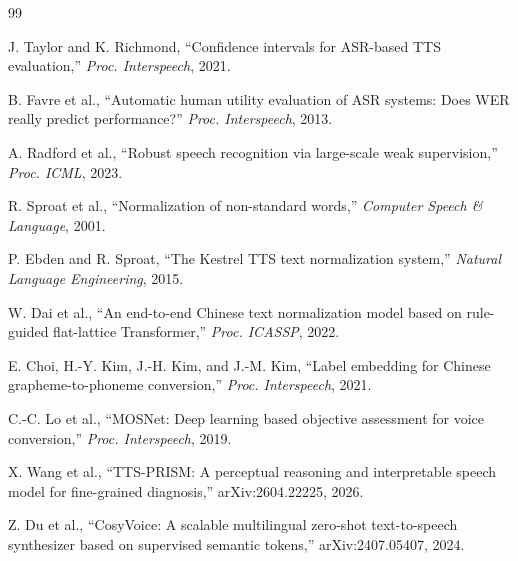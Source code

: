 \documentclass{article}
\begin{document}
\begin{thebibliography}{99}

J. Taylor and K. Richmond, ``Confidence intervals for ASR-based TTS evaluation,'' \emph{Proc. Interspeech}, 2021.

B. Favre et al., ``Automatic human utility evaluation of ASR systems: Does WER really predict performance?'' \emph{Proc. Interspeech}, 2013.

A. Radford et al., ``Robust speech recognition via large-scale weak supervision,'' \emph{Proc. ICML}, 2023.

R. Sproat et al., ``Normalization of non-standard words,'' \emph{Computer Speech \& Language}, 2001.

P. Ebden and R. Sproat, ``The Kestrel TTS text normalization system,'' \emph{Natural Language Engineering}, 2015.

W. Dai et al., ``An end-to-end Chinese text normalization model based on rule-guided flat-lattice Transformer,'' \emph{Proc. ICASSP}, 2022.

E. Choi, H.-Y. Kim, J.-H. Kim, and J.-M. Kim, ``Label embedding for Chinese grapheme-to-phoneme conversion,'' \emph{Proc. Interspeech}, 2021.

C.-C. Lo et al., ``MOSNet: Deep learning based objective assessment for voice conversion,'' \emph{Proc. Interspeech}, 2019.

X. Wang et al., ``TTS-PRISM: A perceptual reasoning and interpretable speech model for fine-grained diagnosis,'' arXiv:2604.22225, 2026.

Z. Du et al., ``CosyVoice: A scalable multilingual zero-shot text-to-speech synthesizer based on supervised semantic tokens,'' arXiv:2407.05407, 2024.

\end{thebibliography}
\end{document}
